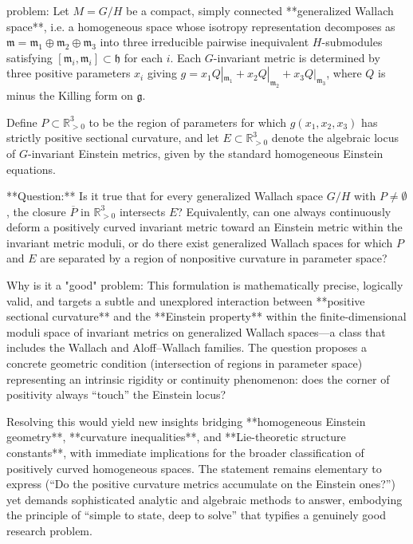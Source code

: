 problem:  
Let \(M = G/H\) be a compact, simply connected **generalized Wallach space**, i.e. a homogeneous space whose isotropy representation decomposes as \(\mathfrak{m} = \mathfrak{m}_1 \oplus \mathfrak{m}_2 \oplus \mathfrak{m}_3\) into three irreducible pairwise inequivalent \(H\)-submodules satisfying \([\mathfrak{m}_i, \mathfrak{m}_i] \subset \mathfrak{h}\) for each \(i\). Each \(G\)-invariant metric is determined by three positive parameters \(x_i\) giving \(g = x_1 Q|_{\mathfrak{m}_1} + x_2 Q|_{\mathfrak{m}_2} + x_3 Q|_{\mathfrak{m}_3}\), where \(Q\) is minus the Killing form on \(\mathfrak{g}\).  

Define \(P \subset \mathbb{R}^3_{>0}\) to be the region of parameters for which \(g(x_1,x_2,x_3)\) has strictly positive sectional curvature, and let \(E \subset \mathbb{R}^3_{>0}\) denote the algebraic locus of \(G\)-invariant Einstein metrics, given by the standard homogeneous Einstein equations.  

**Question:**  
Is it true that for every generalized Wallach space \(G/H\) with \(P \neq \emptyset\), the closure \(\overline{P}\) in \(\mathbb{R}^3_{>0}\) intersects \(E\)?  
Equivalently, can one always continuously deform a positively curved invariant metric toward an Einstein metric within the invariant metric moduli, or do there exist generalized Wallach spaces for which \(P\) and \(E\) are separated by a region of nonpositive curvature in parameter space?  

Why is it a "good" problem:  
This formulation is mathematically precise, logically valid, and targets a subtle and unexplored interaction between **positive sectional curvature** and the **Einstein property** within the finite-dimensional moduli space of invariant metrics on generalized Wallach spaces—a class that includes the Wallach and Aloff–Wallach families. The question proposes a concrete geometric condition (intersection of regions in parameter space) representing an intrinsic rigidity or continuity phenomenon: does the corner of positivity always “touch” the Einstein locus?

Resolving this would yield new insights bridging **homogeneous Einstein geometry**, **curvature inequalities**, and **Lie-theoretic structure constants**, with immediate implications for the broader classification of positively curved homogeneous spaces. The statement remains elementary to express (“Do the positive curvature metrics accumulate on the Einstein ones?”) yet demands sophisticated analytic and algebraic methods to answer, embodying the principle of “simple to state, deep to solve” that typifies a genuinely good research problem.